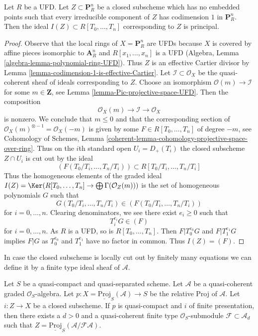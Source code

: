 \begin{lemma}
\label{lemma-equation-codim-1-in-projective-space}
Let $R$ be a UFD. Let $Z \subset \mathbf{P}^n_R$ be a closed subscheme
which has no embedded points such that every irreducible component
of $Z$ has codimension $1$ in $\mathbf{P}^n_R$.
Then the ideal $I(Z) \subset R[T_0, \ldots, T_n]$ corresponding
to $Z$ is principal.
\end{lemma}

\begin{proof}
Observe that the local rings of $X = \mathbf{P}^n_R$ are
UFDs because $X$ is covered by affine pieces isomorphic
to $\mathbf{A}^n_R$ and $R[x_1, \ldots, x_n]$ is a UFD
(Algebra, Lemma \ref{algebra-lemma-polynomial-ring-UFD}).
Thus $Z$ is an effective Cartier divisor by
Lemma \ref{lemma-codimension-1-is-effective-Cartier}.
Let $\mathcal{I} \subset \mathcal{O}_X$ be the quasi-coherent
sheaf of ideals corresponding to $Z$.
Choose an isomorphism $\mathcal{O}(m) \to \mathcal{I}$
for some $m \in \mathbf{Z}$, see
Lemma \ref{lemma-Pic-projective-space-UFD}.
Then the composition
$$
\mathcal{O}_X(m) \to \mathcal{I} \to \mathcal{O}_X
$$
is nonzero. We conclude that $m \leq 0$ and that the corresponding
section of $\mathcal{O}_X(m)^{\otimes -1} = \mathcal{O}_X(-m)$
is given by some $F \in R[T_0, \ldots, T_n]$ of degree $-m$, see
Cohomology of Schemes, Lemma
\ref{coherent-lemma-cohomology-projective-space-over-ring}.
Thus on the $i$th standard open $U_i = D_+(T_i)$ the
closed subscheme $Z \cap U_i$ is cut out by the ideal
$$
(F(T_0/T_i, \ldots, T_n/T_i)) \subset R[T_0/T_i, \ldots, T_n/T_i]
$$
Thus the homogeneous elements of the graded ideal
$I(Z) = \Ker(R[T_0, \ldots, T_n] \to \bigoplus \Gamma(\mathcal{O}_Z(m)))$
is the set of homogeneous polynomials $G$ such that
$$
G(T_0/T_i, \ldots, T_n/T_i) \in (F(T_0/T_i, \ldots, T_n/T_i))
$$
for $i = 0, \ldots, n$. Clearing denominators, we see there exist
$e_i \geq 0$ such that
$$
T_i^{e_i}G \in (F)
$$
for $i = 0, \ldots, n$. As $R$ is a UFD, so is $R[T_0, \ldots, T_n]$.
Then $F | T_0^{e_0}G$ and $F | T_1^{e_1}G$ implies $F | G$ as
$T_0^{e_0}$ and $T_1^{e_1}$ have no factor in common. Thus $I(Z) = (F)$.
\end{proof}

\noindent
In case the closed subscheme is locally cut out by finitely many
equations we can define it by a finite type ideal sheaf of
$\mathcal{A}$.

\begin{lemma}
\label{lemma-closed-subscheme-proj-finite}
Let $S$ be a quasi-compact and quasi-separated scheme.
Let $\mathcal{A}$ be a quasi-coherent graded $\mathcal{O}_S$-algebra. Let
$p : X = \underline{\text{Proj}}_S(\mathcal{A}) \to S$ be the relative
Proj of $\mathcal{A}$. Let $i : Z \to X$ be a closed subscheme.
If $p$ is quasi-compact and $i$ of finite presentation, then there exists
a $d > 0$ and a quasi-coherent finite type $\mathcal{O}_S$-submodule
$\mathcal{F} \subset \mathcal{A}_d$ such that
$Z = \underline{\text{Proj}}_S(\mathcal{A}/\mathcal{F}\mathcal{A})$.
\end{lemma}

